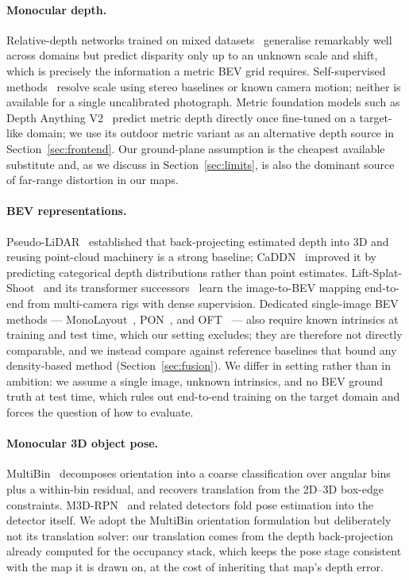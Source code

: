 \documentclass[sigconf]{acmart}
\newcommand{\rev}[1]{{\color{revcolor}#1}}
\begin{document}
\paragraph{Monocular depth.} Relative-depth networks trained on mixed datasets~\cite{ranftl2021dpt,ranftl2022midas} generalise remarkably well across domains but predict disparity only up to an unknown scale and shift, which is precisely the information a metric BEV grid requires. Self-supervised methods~\cite{godard2019monodepth2} resolve scale using stereo baselines or known camera motion; neither is available for a single uncalibrated photograph. \rev{Metric foundation models such as Depth Anything V2~\cite{yang2024depthanythingv2} predict metric depth directly once fine-tuned on a target-like domain; we use its outdoor metric variant as an alternative depth source in Section~\ref{sec:frontend}.} Our ground-plane assumption is the cheapest available substitute and, as we discuss in Section~\ref{sec:limits}, is also the dominant source of far-range distortion in our maps.

\paragraph{BEV representations.} Pseudo-LiDAR~\cite{wang2019pseudolidar} established that back-projecting estimated depth into 3D and reusing point-cloud machinery is a strong baseline; CaDDN~\cite{reading2021caddn} improved it by predicting categorical depth distributions rather than point estimates. Lift-Splat-Shoot~\cite{philion2020lss} and its transformer successors~\cite{li2022bevformer,zhou2022cvt} learn the image-to-BEV mapping end-to-end from multi-camera rigs with dense supervision. \rev{Dedicated single-image BEV methods --- MonoLayout~\cite{mani2020monolayout}, PON~\cite{roddick2020pon}, and OFT~\cite{roddick2019oft} --- also require known intrinsics at training and test time, which our setting excludes; they are therefore not directly comparable, and we instead compare against reference baselines that bound any density-based method (Section~\ref{sec:fusion}).} We differ in setting rather than in ambition: we assume a single image, unknown intrinsics, and no BEV ground truth at test time, which rules out end-to-end training on the target domain and forces the question of how to evaluate.

\paragraph{Monocular 3D object pose.} MultiBin~\cite{mousavian2017multibin} decomposes orientation into a coarse classification over angular bins plus a within-bin residual, and recovers translation from the 2D--3D box-edge constraints. M3D-RPN~\cite{brazil2019m3drpn} and related detectors fold pose estimation into the detector itself. We adopt the MultiBin orientation formulation but deliberately not its translation solver: our translation comes from the depth back-projection already computed for the occupancy stack, which keeps the pose stage consistent with the map it is drawn on, at the cost of inheriting that map's depth error.
\end{document}
